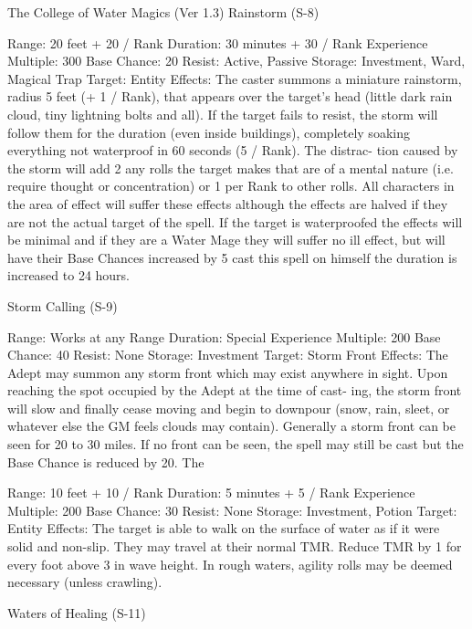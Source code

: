 \begin{Chapter}{The College of Water Magics (Ver 1.3)}
Rainstorm (S-8) 

Range: 20 feet + 20 / Rank 
Duration: 30 minutes + 30 / Rank 
Experience Multiple: 300 
Base Chance: 20%
Resist: Active, Passive 
Storage: Investment, Ward, Magical Trap 
Target: Entity 
Effects: The caster summons a miniature rainstorm, 
radius  5  feet  (+  1  /  Rank),  that  appears  over  the 
target’s  head  (little  dark  rain  cloud,  tiny  lightning 
bolts and all). If the target fails to resist, the storm 
will  follow  them  for  the  duration  (even  inside 
buildings),  completely  soaking  everything  not 
waterproof  in  60  seconds  (5  /  Rank).  The  distrac-
tion  caused  by  the  storm will  add 2%
any  rolls  the  target  makes  that  are  of  a  mental 
nature (i.e. require thought or concentration) or 1%
per Rank to other rolls. All characters in the area of 
effect  will  suffer  these  effects  although  the  effects 
are  halved  if  they  are  not  the  actual  target  of  the 
spell.  If  the  target  is  waterproofed  the  effects  will 
be minimal and if they are a Water Mage they will 
suffer  no  ill  effect,  but  will  have  their  Base 
Chances increased by 5%
cast this  spell  on  himself  the  duration  is  increased 
to 24 hours. 

Storm Calling (S-9) 

Range: Works at any Range 
Duration: Special 
Experience Multiple: 200 
Base Chance: 40%
Resist: None 
Storage: Investment 
Target: Storm Front 
Effects:  The  Adept  may  summon  any  storm  front 
which may exist anywhere in sight. Upon reaching 
the spot occupied by the Adept at the time of cast-
ing,  the  storm  front  will  slow  and  finally  cease 
moving  and  begin  to  downpour  (snow,  rain,  sleet, 
or whatever else the GM feels clouds may contain). 
Generally  a  storm  front  can  be  seen  for  20  to  30 
miles. If no front can be seen, the spell may still be 
cast  but  the  Base  Chance  is  reduced  by  20.  The 

Range: 10 feet + 10 / Rank 
Duration: 5 minutes + 5 / Rank 
Experience Multiple: 200 
Base Chance: 30%
Resist: None 
Storage: Investment, Potion 
Target: Entity 
Effects: The target is able to walk on the surface of 
water  as  if  it  were  solid  and  non-slip.  They  may 
travel at their normal TMR. Reduce TMR by 1 for 
every foot above 3 in wave height. In rough waters, 
agility  rolls  may  be  deemed  necessary  (unless 
crawling). 

Waters of Healing (S-11) 


\end{Chapter}
